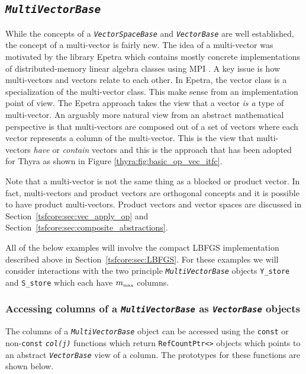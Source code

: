 \documentclass[pdf,ps2pdf,11pt]{SANDreport}
\begin{document}
%
\subsection{\texttt{\textit{Multi\-Vector\-Base}}}
\label{tsfcore:sec:multi_vec}
%

While the concepts of a {}\texttt{\textit{Vector\-Space\-Base}} and
{}\texttt{\textit{Vector\-Base}} are well established, the concept of a
multi-vector is fairly new.  The idea of a multi-vector was motivated
by the library Epetra {}\cite{ref:Epetra} which contains mostly
concrete implementations of distributed-memory linear algebra classes
using MPI {}\cite{ref:mpi}.  A key issue is how multi-vectors and
vectors relate to each other.  In Epetra, the vector class is a
specialization of the multi-vector class.  This make sense from an
implementation point of view.  The Epetra approach takes the view that
a vector {\em is a} type of multi-vector.  An arguably more natural
view from an abstract mathematical perspective is that multi-vectors
are composed out of a set of vectors where each vector represents a
column of the multi-vector.  This is the view that multi-vectors {\em
have} or {\em contain} vectors and this is the approach that has been
adopted for Thyra as shown in Figure {}\ref{thyra:fig:basic_op_vec_itfc}.

Note that a multi-vector is not the same thing as a blocked or product vector.
In fact, multi-vectors and product vectors are orthogonal concepts and it is
possible to have product multi-vectors.  Product vectors and vector spaces are
discussed in Section~\ref{tsfcore:sec:vec_apply_op} and
Section~\ref{tsfcore:sec:composite_abstractions}.

All of the below examples will involve the compact LBFGS implementation
described above in Section~\ref{tsfcore:sec:LBFGS}.  For these examples we
will consider interactions with the two principle
{}\texttt{\textit{Multi\-Vector\-Base}} objects {}\texttt{Y\_store} and
{}\texttt{S\_store} which each have $m_{\tiny\mbox{max}}$ columns.

%
\subsubsection{Accessing columns of a {}\texttt{\textit{Multi\-Vector\-Base}}
as {}\texttt{\textit{Vector\-Base}} objects}
%

The columns of a {}\texttt{\textit{Multi\-Vector\-Base}} object can be
accessed using the {}\texttt{const} or non-\texttt{const}
{}\texttt{\textit{col(j)}} functions which return
{}\texttt{RefCountPtr<>} objects which points to an abstract
{}\texttt{\textit{Vector\-Base}} view of a column.  The prototypes for these
functions are shown below.
\end{document}
